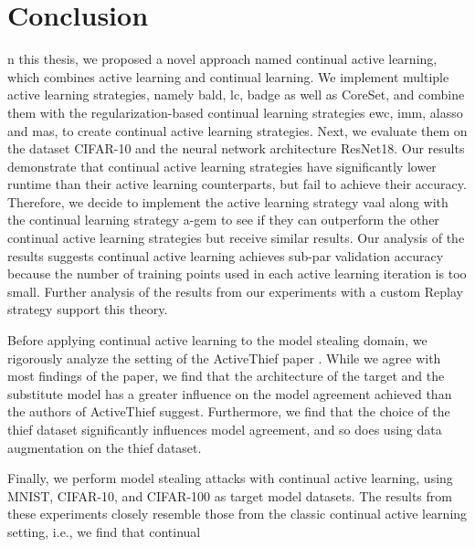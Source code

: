 
\chapter{Conclusion}
\label{ch:Conclusion}
n this thesis, we proposed a novel approach named continual active learning, which combines active learning and continual learning. 
We implement multiple active learning strategies, namely \gls{bald}, \gls{lc}, \gls{badge} as well as CoreSet, and combine them with
the regularization-based continual learning strategies \gls{ewc}, \gls{imm}, \gls{alasso} and \gls{mas}, to create continual active
learning strategies. Next, we evaluate them on the dataset CIFAR-10 and the neural network architecture ResNet18. Our results demonstrate
that continual active learning strategies have significantly lower runtime than their active learning counterparts, but fail to achieve
their accuracy. Therefore, we decide to implement the active learning strategy \gls{vaal} along with the continual learning strategy \gls{a-gem}
to see if they can outperform the other continual active learning strategies but receive similar results. Our analysis of the results
suggests continual active learning achieves sub-par validation accuracy because the number of training points used in each active
learning iteration is too small. Further analysis of the results from our experiments with a custom Replay strategy support this theory. \par
Before applying continual active learning to the model stealing domain, we rigorously analyze the setting of the ActiveThief paper
\cite{pal2020activethief}. While we agree with most findings of the paper, we find that the architecture of the target and the substitute
model has a greater influence on the model agreement achieved than the authors of ActiveThief suggest. Furthermore, we find that the
choice of the thief dataset significantly influences model agreement, and so does using data augmentation on the thief dataset. \par
Finally, we perform model stealing attacks with continual active learning, using MNIST, CIFAR-10, and CIFAR-100 as target model datasets.
The results from these experiments closely resemble those from the classic continual active learning setting, i.e., we find that continual
